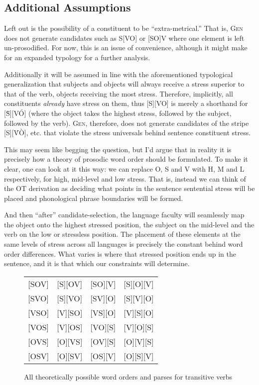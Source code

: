 \documentclass{article}
\begin{document}
\subsection{Additional Assumptions\label{assump}}

Left out is the possibility of a constituent to be ``extra-metrical.''
That is, \textsc{Gen} does not generate candidates such as S[VO] or [SO]V where one element is left un-prosodified.
For now, this is an issue of convenience, although it might make for an expanded typology for a further analysis.

Additionally it will be assumed in line with the aforementioned typological generalization that subjects and objects will always receive a stress superior to that of the verb, objects receiving the most stress.
Therefore, implicitly, all constituents \emph{already} have stress on them, thus [S][VO] is merely a shorthand for [{\`S}][V\'O] (where the object takes the highest stress, followed by the subject, followed by the verb).
\textsc{Gen}, therefore, does not generate candidates of the stripe [S][\'V\`O], etc. that violate the stress universals behind sentence constituent stress.

This may seem like begging the question, but I'd argue that in reality it is precisely how a theory of prosodic word order should be formulated.
To make it clear, one can look at it this way: we can replace O, S and V with H, M and L respectively, for high, mid-level and low stress.
That is, instead we can think of the OT derivation as deciding what points in the sentence sentential stress will be placed and phonological phrase boundaries will be formed.

And then ``after'' candidate-selection, the language faculty will seamlessly map the object onto the highest stressed position, the subject on the mid-level and the verb on the low or stressless position.
The placement of these elements at the same levels of stress across all languages is precisely the constant behind word order differences.
What varies is where that stressed position ends up in the sentence, and it is that which our constraints will determine.

\begin{figure}
	\begin{center}
	\begin{tabular}{cccc}
		{}[SOV]&[S][OV]&[SO][V]&[S][O][V]\\
		{}[SVO]&[S][VO]&[SV][O]&[S][V][O]\\
		{}[VSO]&[V][SO]&[VS][O]&[V][S][O]\\
		{}[VOS]&[V][OS]&[VO][S]&[V][O][S]\\
		{}[OVS]&[O][VS]&[OV][S]&[O][V][S]\\
		{}[OSV]&[O][SV]&[OS][V]&[O][S][V]\\
	\end{tabular}
	\end{center}
	\caption{All theoretically possible word orders and parses for transitive verbs\label{allcand}}
\end{figure}
\end{document}
